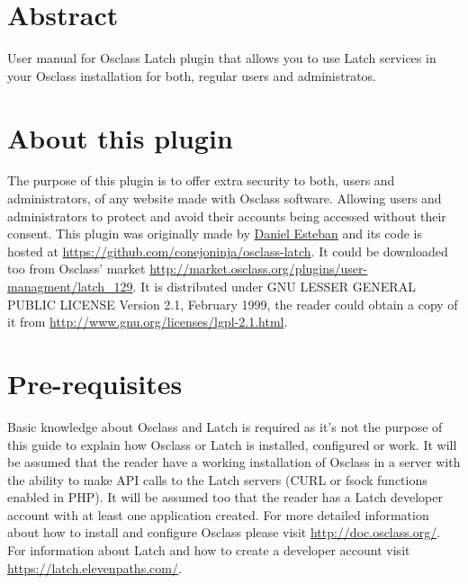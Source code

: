 \documentclass[
10pt,
a4paper,
oneside,
headinclude,footinclude,
BCOR5mm,
]{scrartcl}
\title{\normalfont\spacedallcaps{Osclass Latch Plugin User Manual}}
\author{\spacedlowsmallcaps{Daniel Esteban}}
\begin{document}
\renewcommand{\sectionmark}[1]{\markright{\spacedlowsmallcaps{#1}}}
\lehead{\mbox{\llap{\small\thepage\kern1em\color{halfgray} \vline}\color{halfgray}\hspace{0.5em}\rightmark\hfil}}

\pagestyle{scrheadings} 

\maketitle
\setcounter{tocdepth}{2}
\tableofcontents
\listoffigures

\section*{Abstract}
User manual for Osclass Latch plugin that allows you to use Latch services in your Osclass installation for both, regular users and administratos.


\newpage 

\section{About this plugin}
The purpose of this plugin is to offer extra security to both, users and administrators, of any website made with Osclass software. Allowing users and administrators to protect and avoid their accounts being accessed without their consent. This plugin was originally made by \href{https://github.com/conejoninja}{Daniel Esteban} and its code is hosted at \href{https://github.com/conejoninja/osclass-latch}{https://github.com/conejoninja/osclass-latch}. It could be downloaded too from Osclass' market \href{http://market.osclass.org/plugins/user-managment/latch\_129}{http://market.osclass.org/plugins/user-managment/latch\_129}. It is distributed under GNU LESSER GENERAL PUBLIC LICENSE Version 2.1, February 1999, the reader could obtain a copy of it from \href{http://www.gnu.org/licenses/lgpl-2.1.html}{http://www.gnu.org/licenses/lgpl-2.1.html}.


\section{Pre-requisites}
Basic knowledge about Osclass and Latch is required as it's not the purpose of this guide to explain how Osclass or Latch is installed, configured or work. It will be assumed that the reader have a working installation of Osclass in a server with the ability to make API calls to the Latch servers (CURL or fsock functions enabled in PHP). It will be assumed too that the reader has a Latch developer account with at least one application created. For more detailed information about how to install and configure Osclass please visit \href{http://doc.osclass.org/}{http://doc.osclass.org/}. For information about Latch and how to create a developer account visit \href{https://latch.elevenpaths.com/}{https://latch.elevenpaths.com/}.
\end{document}
